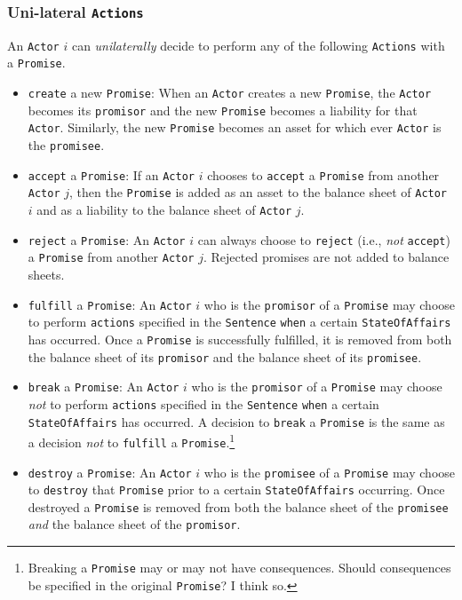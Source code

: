 \documentclass[a4paper]{article}
\begin{document}
\subsubsection{Uni-lateral \texttt{Actions}}
An \texttt{Actor} $i$ can \textit{unilaterally} decide to perform any of the following \texttt{Actions} with a \texttt{Promise}. 
\begin{itemize}
	\item \texttt{create} a new \texttt{Promise}: When an \texttt{Actor} creates a new \texttt{Promise}, the \texttt{Actor} becomes its \texttt{promisor} and the new \texttt{Promise} becomes a liability for that \texttt{Actor}. Similarly, the new \texttt{Promise} becomes an asset for which ever \texttt{Actor} is the \texttt{promisee}.
	\item \texttt{accept} a \texttt{Promise}: If an \texttt{Actor} $i$ chooses to \texttt{accept} a \texttt{Promise} from another \texttt{Actor} $j$, then the \texttt{Promise} is added as an asset to the balance sheet of \texttt{Actor} $i$ and as a liability to the balance sheet of \texttt{Actor} $j$.
	\item \texttt{reject} a \texttt{Promise}: An \texttt{Actor} $i$ can always choose to \texttt{reject} (i.e., \textit{not} \texttt{accept}) a \texttt{Promise} from another \texttt{Actor} $j$. Rejected promises are not added to balance sheets.
	\item \texttt{fulfill} a \texttt{Promise}: An \texttt{Actor} $i$ who is the \texttt{promisor} of a \texttt{Promise} may choose to perform \texttt{actions} specified in the \texttt{Sentence} \texttt{when} a certain \texttt{StateOfAffairs} has occurred. Once a \texttt{Promise} is successfully fulfilled, it is removed from both the balance sheet of its \texttt{promisor} and the balance sheet of its \texttt{promisee}.
	\item \texttt{break} a \texttt{Promise}: An \texttt{Actor} $i$ who is the \texttt{promisor} of a \texttt{Promise} may choose \textit{not} to perform \texttt{actions} specified in the \texttt{Sentence} \texttt{when} a certain \texttt{StateOfAffairs} has occurred. A decision to \texttt{break} a \texttt{Promise} is the same as a decision \textit{not} to \texttt{fulfill} a \texttt{Promise}.\footnote{
	Breaking a \texttt{Promise} may or may not have consequences. Should consequences be specified in the original \texttt{Promise}? I think so.
	} 
	\item \texttt{destroy} a \texttt{Promise}: An \texttt{Actor} $i$ who is the \texttt{promisee} of a \texttt{Promise} may choose to \texttt{destroy} that \texttt{Promise} prior to a certain \texttt{StateOfAffairs} occurring. Once destroyed a \texttt{Promise} is removed from both the balance sheet of the \texttt{promisee} \textit{and} the balance sheet of the \texttt{promisor}.   

\end{itemize}
\end{document}
